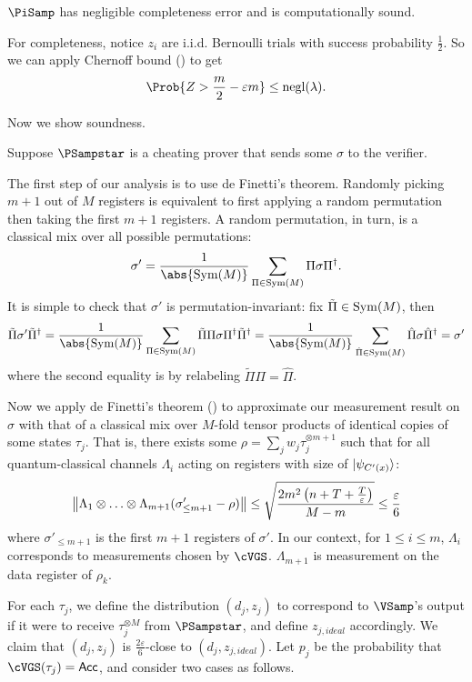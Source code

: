 \begin{thm}
    \label{QPIP1thm}
	$\PiSamp$ has negligible completeness error and is computationally sound.
\end{thm}
\begin{prf}
	For completeness, notice $z_i$ are i.i.d. Bernoulli trials with success probability $\frac{1}{2}$.
	So we can apply Chernoff bound () to get
	$$\Prob{Z>\frac{m}{2}-\varepsilon m}\leq\negl(\lambda).$$
	
	Now we show soundness.

	Suppose $\PSampstar$ is a cheating prover that sends some $\sigma$ to the verifier.

	The first step of our analysis is to use de Finetti's theorem.
	Randomly picking $m+1$ out of $M$ registers is equivalent to first applying a random permutation then taking the first $m+1$ registers.
	A random permutation, in turn, is a classical mix over all possible permutations:
	$$\sigma'=\frac{1}{\abs{\Sym(M)}}\sum_{\Pi\in\Sym(M)}\Pi\sigma\Pi^\dagger.$$
	It is simple to check that $\sigma'$ is permutation-invariant:
	fix $\tilde{\Pi}\in\operatorname{Sym}(M)$, then
	$$\tilde{\Pi}\sigma'\tilde{\Pi}^\dagger
	=\frac{1}{\abs{\Sym(M)}}\sum_{\Pi\in\Sym(M)}\tilde{\Pi}\Pi\sigma\Pi^\dagger\tilde{\Pi}^\dagger
	=\frac{1}{\abs{\Sym(M)}}\sum_{\hat{\Pi}\in\Sym(M)}\hat{\Pi}\sigma\hat{\Pi}^\dagger
	=\sigma'$$
	where the second equality is by relabeling $\tilde{\Pi}\Pi=\hat{\Pi}$.

	Now we apply de Finetti's theorem () to approximate our measurement result on $\sigma$ with that of a classical mix over $M$-fold tensor products of identical copies of some states $\tau_j$.
	That is, there exists some $\rho=\sum_j w_j\tau_j^{\otimes m+1}$
	such that for all quantum-classical channels $\Lambda_i$ acting on registers with size of $\ket{\psi_{C'(x)}}$:
	$$\left\lVert\Lambda_1\otimes\ldots\otimes\Lambda_{m+1}(\sigma'_{\leq m+1}-\rho)\right\rVert
	\leq\sqrt{\frac{2m^2\left(n+T+\frac{T}{\varepsilon}\right)}{M-m}}
	\leq\frac{\varepsilon}{6}$$
	where $\sigma'_{\leq m+1}$ is the first $m+1$ registers of $\sigma'$.
	In our context, for $1\leq i\leq m$, $\Lambda_i$ corresponds to measurements chosen by $\cVGS$.
	$\Lambda_{m+1}$ is measurement on the data register of $\rho_k$.
	
	For each $\tau_j$, we define the distribution $(d_j, z_j)$ to correspond to $\VSamp$'s output if it were to receive $\tau_j^{\otimes M}$ from $\PSampstar$, and define $z_{j, ideal}$ accordingly.
	We claim that $(d_j, z_j)$ is $\frac{2\varepsilon}{6}$-close to $(d_j, z_{j, ideal})$.
	Let $p_j$ be the probability that $\cVGS(\tau_j)=\Acc$, and consider two cases as follows.


\end{prf}
